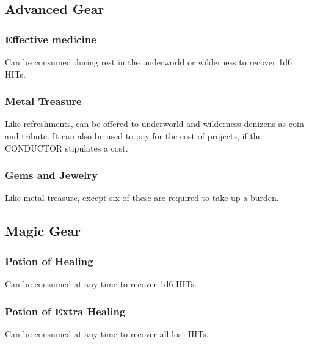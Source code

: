 \subsection{Advanced Gear}
\begin{multicols}{2}
\subsubsection*{Effective medicine}
Can be consumed during rest in the underworld or wilderness to recover 1d6 HITs.

\subsubsection*{Metal Treasure}
Like refreshments, can be offered to underworld and wilderness denizens as coin and tribute. It can also be used to pay for the cost of projects, if the CONDUCTOR stipulates a cost.

\subsubsection*{Gems and Jewelry}
Like metal treasure, except six of these are required to take up a burden.

\end{multicols}

\subsection{Magic Gear}
\begin{multicols}{2}
\subsubsection*{Potion of Healing}
Can be consumed at any time to recover 1d6 HITs.

\subsubsection*{Potion of Extra Healing}
Can be consumed at any time to recover all lost HITs.

\end{multicols}